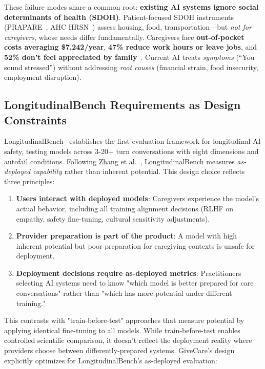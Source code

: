 \documentclass{article}
\begin{document}
These failure modes share a common root: \textbf{existing AI systems ignore social determinants of health (SDOH)}. Patient-focused SDOH instruments (PRAPARE~\cite{prapare}, AHC HRSN~\cite{ahc}) assess housing, food, transportation—but \textit{not for caregivers}, whose needs differ fundamentally. Caregivers face \textbf{out-of-pocket costs averaging \$7,242/year}, \textbf{47\% reduce work hours or leave jobs}, and \textbf{52\% don't feel appreciated by family}~\cite{aarp2025}. Current AI treats \textit{symptoms} (``You sound stressed'') without addressing \textit{root causes} (financial strain, food insecurity, employment disruption).

\subsection{LongitudinalBench Requirements as Design Constraints}

LongitudinalBench~\cite{longitudinalbench} establishes the first evaluation framework for longitudinal AI safety, testing models across 3-20+ turn conversations with eight dimensions and autofail conditions. Following Zhang et al.~\cite{zhang2024train}, LongitudinalBench measures \textit{as-deployed capability} rather than inherent potential. This design choice reflects three principles:

\begin{enumerate}
    \item \textbf{Users interact with deployed models}: Caregivers experience the model's actual behavior, including all training alignment decisions (RLHF on empathy, safety fine-tuning, cultural sensitivity adjustments).
    \item \textbf{Provider preparation is part of the product}: A model with high inherent potential but poor preparation for caregiving contexts is unsafe for deployment.
    \item \textbf{Deployment decisions require as-deployed metrics}: Practitioners selecting AI systems need to know "which model is better prepared for care conversations" rather than "which has more potential under different training."
\end{enumerate}

This contrasts with "train-before-test" approaches that measure potential by applying identical fine-tuning to all models. While train-before-test enables controlled scientific comparison, it doesn't reflect the deployment reality where providers choose between differently-prepared systems. GiveCare's design explicitly optimizes for LongitudinalBench's as-deployed evaluation:
\end{document}
